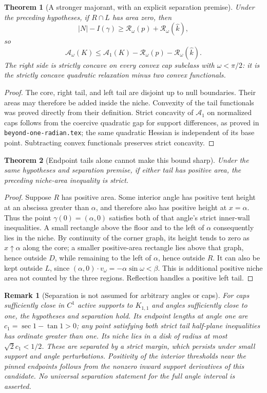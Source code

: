 \documentclass[11pt]{article}
\newtheorem{theorem}{Theorem}
\newtheorem{remark}{Remark}
\begin{document}
\begin{theorem}[A stronger majorant, with an explicit separation premise]
Under the preceding hypotheses, if $R\cap L$ has area zero, then
\[
 |N|-I(\gamma)\ge\mathcal R_\omega(p)+\mathcal R_\omega(\widehat k),
\]
so
\[
 \mathcal A_\omega(K)\le\mathcal A_1(K)-\mathcal R_\omega(p)-\mathcal R_\omega(\widehat k).
\]
The right side is strictly concave on every convex cap subclass with $\omega<\pi/2$: it is the strictly concave quadratic relaxation minus two convex functionals.
\end{theorem}
\begin{proof}
The core, right tail, and left tail are disjoint up to null boundaries. Their areas may therefore be added inside the niche. Convexity of the tail functionals was proved directly from their definition. Strict concavity of $\mathcal A_1$ on normalized caps follows from the coercive quadratic gap for support differences, as proved in \texttt{beyond-one-radian.tex}; the same quadratic Hessian is independent of its base point. Subtracting convex functionals preserves strict concavity.
\end{proof}

\begin{theorem}[Endpoint tails alone cannot make this bound sharp]
Under the same hypotheses and separation premise, if either tail has positive area, the preceding niche-area inequality is strict.
\end{theorem}
\begin{proof}
Suppose $R$ has positive area. Some interior angle has positive tent height at an abscissa greater than $\alpha$, and therefore also has positive height at $x=\alpha$. Thus the point $\gamma(0)=(\alpha,0)$ satisfies both of that angle's strict inner-wall inequalities. A small rectangle above the floor and to the left of $\alpha$ consequently lies in the niche. By continuity of the corner graph, its height tends to zero as $x\uparrow\alpha$ along the core; a smaller positive-area rectangle lies above that graph, hence outside $D$, while remaining to the left of $\alpha$, hence outside $R$. It can also be kept outside $L$, since $(\alpha,0)\cdot v_\omega=-\alpha\sin\omega<\beta$. This is additional positive niche area not counted by the three regions. Reflection handles a positive left tail.
\end{proof}

\begin{remark}[Separation is not assumed for arbitrary angles or caps]
For caps sufficiently close in $C^1$ active supports to $K_{1,1}$ and angles sufficiently close to one, the hypotheses and separation hold. Its endpoint lengths at angle one are $c_1=\sec1-\tan1>0$; any point satisfying both strict tail half-plane inequalities has ordinate greater than one. Its niche lies in a disk of radius at most $\sqrt2c_1<1/2$. These are separated by a strict margin, which persists under small support and angle perturbations. Positivity of the interior thresholds near the pinned endpoints follows from the nonzero inward support derivatives of this candidate. No universal separation statement for the full angle interval is asserted.
\end{remark}
\end{document}
